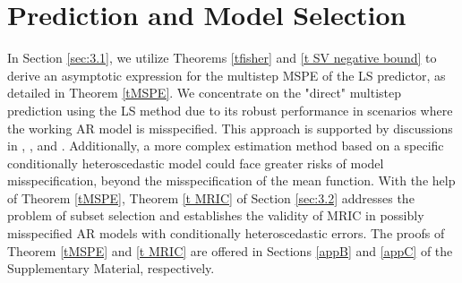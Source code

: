 \documentclass[ejsv2]{imsart}
\theoremstyle{plain}
\theoremstyle{definition}
\theoremstyle{remark}
\begin{document}
\section{Prediction and Model Selection}\label{sec:3}
In Section \ref{sec:3.1}, we utilize Theorems
\ref{tfisher} and \ref{t SV negative bound} to derive an asymptotic expression for the multistep MSPE of the LS predictor, as detailed in Theorem \ref{tMSPE}. We concentrate on the "direct" multistep prediction using the LS method due to its robust performance in scenarios where the working AR model is misspecified. This approach is supported by discussions in \cite{Chevillon2007}, \cite{Ing2003a}, and \cite{OJ05}. Additionally, 
a more complex estimation method based on a specific conditionally heteroscedastic model could face greater risks of model misspecification, beyond the misspecification of the mean function.
With the help of Theorem \ref{tMSPE},
Theorem \ref{t MRIC} of
Section \ref{sec:3.2} addresses the problem of subset selection
and establishes the validity of MRIC in possibly
misspecified AR models with conditionally heteroscedastic errors.
The proofs of Theorem \ref{tMSPE} and
\ref{t MRIC} are offered in Sections \ref{appB} and \ref{appC} of the Supplementary Material, respectively. %
\end{document}
